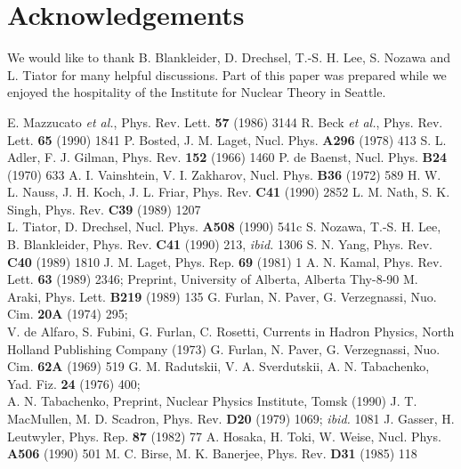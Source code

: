 \section*{Acknowledgements}
We would like to thank B. Blankleider, D. Drechsel, T.-S. H. Lee,
S. Nozawa and L. Tiator for many helpful
discussions. Part of this paper was prepared while we
enjoyed the hospitality of the Institute for Nuclear Theory in
Seattle.  
\newpage   
\begin{thebibliography}{99}
 E. Mazzucato {\em et al.}, Phys. Rev. Lett. {\bf 57} (1986) 3144
 R. Beck {\em et al.}, Phys. Rev. Lett. {\bf 65} (1990) 1841
  P. Bosted, J. M. Laget, Nucl. Phys. {\bf A296} (1978) 413	      
  S. L. Adler, F. J. Gilman, Phys. Rev. {\bf 152} (1966) 1460
 P. de Baenst, Nucl. Phys. {\bf B24} (1970) 633
  A. I. Vainshtein, V. I. Zakharov, Nucl. Phys. {\bf B36} 
              (1972) 589
 H. W. L. Nauss, J. H. Koch, J. L. Friar, Phys. Rev. {\bf C41}
              (1990) 2852
 L. M. Nath, S. K. Singh, Phys. Rev. {\bf C39} (1989) 1207 \\
              L. Tiator, D. Drechsel, Nucl. Phys. {\bf A508} (1990) 541c
 S. Nozawa, T.-S. H. Lee, B. Blankleider, Phys. Rev. {\bf C41}
              (1990) 213, {\em ibid.} 1306
 S. N. Yang,
	      Phys. Rev. {\bf C40} (1989) 1810
 J. M. Laget, Phys. Rep. {\bf 69} (1981) 1	      
 A. N. Kamal, Phys. Rev. Lett. {\bf 63} (1989) 2346;
              Preprint, University of Alberta, Alberta Thy-8-90
 M. Araki, Phys. Lett. {\bf B219} (1989) 135	      
 G. Furlan, N. Paver, G. Verzegnassi, Nuo. Cim. {\bf 20A}
              (1974) 295;\\
	      V. de Alfaro, S. Fubini, G. Furlan, C. Rosetti, Currents in
	      Hadron Physics, North Holland Publishing Company (1973)  
 G. Furlan, N. Paver, G. Verzegnassi, Nuo. Cim. {\bf 62A} 
              (1969) 519	      
 G. M. Radutskii, V. A. Sverdutskii, A. N. Tabachenko, Yad. Fiz.
              {\bf 24} (1976) 400; \\ 
	      A. N. Tabachenko, Preprint, Nuclear Physics Institute, 
	      Tomsk (1990) 	      
 J. T. MacMullen, M. D. Scadron, Phys. Rev. {\bf D20} (1979)
              1069; {\em ibid.} 1081  	      
 J. Gasser, H. Leutwyler, Phys. Rep. {\bf 87} (1982) 77	      
 A. Hosaka, H. Toki, W. Weise, Nucl. Phys. {\bf A506} (1990) 501
 M. C. Birse, M. K. Banerjee, Phys. Rev. {\bf D31} (1985) 118

\end{thebibliography}
